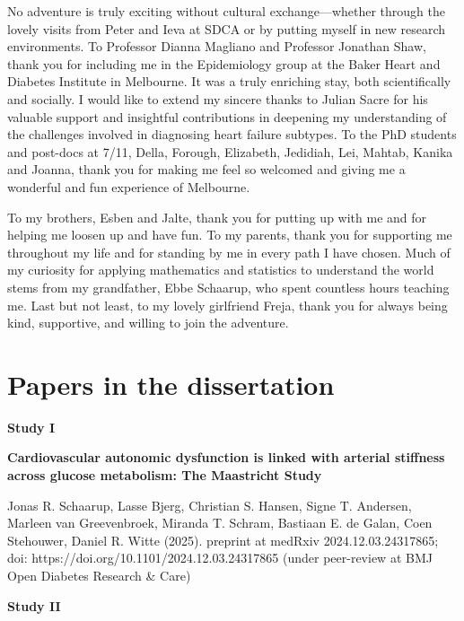 \documentclass[
  a4paper,
  headsepline=true,
  open=any]{scrbook}
\begin{document}
No adventure is truly exciting without cultural exchange---whether
through the lovely visits from Peter and Ieva at SDCA or by putting
myself in new research environments. To Professor Dianna Magliano and
Professor Jonathan Shaw, thank you for including me in the Epidemiology
group at the Baker Heart and Diabetes Institute in Melbourne. It was a
truly enriching stay, both scientifically and socially. I would like to
extend my sincere thanks to Julian Sacre for his valuable support and
insightful contributions in deepening my understanding of the challenges
involved in diagnosing heart failure subtypes. To the PhD students and
post-docs at 7/11, Della, Forough, Elizabeth, Jedidiah, Lei, Mahtab,
Kanika and Joanna, thank you for making me feel so welcomed and giving
me a wonderful and fun experience of Melbourne.

To my brothers, Esben and Jalte, thank you for putting up with me and
for helping me loosen up and have fun. To my parents, thank you for
supporting me throughout my life and for standing by me in every path I
have chosen. Much of my curiosity for applying mathematics and
statistics to understand the world stems from my grandfather, Ebbe
Schaarup, who spent countless hours teaching me. Last but not least, to
my lovely girlfriend Freja, thank you for always being kind, supportive,
and willing to join the adventure.


\hypertarget{sec-linked-papers}{%
\chapter*{Papers in the dissertation}\label{sec-linked-papers}}


\textbf{Study I}

\textbf{Cardiovascular autonomic dysfunction is linked with arterial
stiffness across glucose metabolism: The Maastricht Study}

Jonas R. Schaarup, Lasse Bjerg, Christian S. Hansen, Signe T. Andersen,
Marleen van Greevenbroek, Miranda T. Schram, Bastiaan E. de Galan, Coen
Stehouwer, Daniel R. Witte (2025). preprint at medRxiv
2024.12.03.24317865; doi: https://doi.org/10.1101/2024.12.03.24317865
(under peer-review at BMJ Open Diabetes Research \& Care)

\textbf{Study II}
\end{document}
